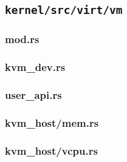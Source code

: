 \documentclass[code]{mancls}
\begin{document}
\subsection{\texttt{kernel/src/virt/vm}}

\subsubsection{mod.rs}


\subsubsection{kvm\_dev.rs}


\subsubsection{user\_api.rs}


\subsubsection{kvm\_host/mem.rs}


\subsubsection{kvm\_host/vcpu.rs}

\end{document}

